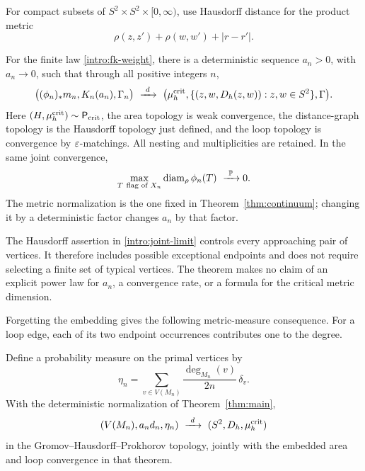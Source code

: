 For compact subsets of $S^2\times S^2\times[0,\infty)$, use Hausdorff distance for the product metric
\[
 \rho(z,z')+\rho(w,w')+|r-r'|.
\]

\begin{theorem}\label{thm:main}
For the finite law \eqref{intro:fk-weight}, there is a deterministic sequence $a_n>0$, with $a_n\to0$, such that through all positive integers $n$,
\begin{equation}\label{intro:joint-limit}
 \bigl((\phi_n)_*m_n,K_n(a_n),\Gamma_n\bigr)
 \ \xrightarrow{\ d\ }\
 \bigl(\mu_h^{\rm crit},
       \{(z,w,D_h(z,w)):z,w\in S^2\},\Gamma\bigr).
\end{equation}
Here $(H,\mu_h^{\rm crit})\sim\mathsf P_{\rm crit}$, the area topology is weak convergence, the distance-graph topology is the Hausdorff topology just defined, and the loop topology is convergence by $\varepsilon$-matchings. All nesting and multiplicities are retained. In the same joint convergence,
\begin{equation}\label{intro:flag-mesh}
 \max_{T\ \text{flag of }X_n}\operatorname{diam}_\rho\phi_n(T)
       \ \xrightarrow{\ \mathbb P\ }0.
\end{equation}
The metric normalization is the one fixed in Theorem~\ref{thm:continuum}; changing it by a deterministic factor changes $a_n$ by that factor.
\end{theorem}

The Hausdorff assertion in \eqref{intro:joint-limit} controls every approaching pair of vertices. It therefore includes possible exceptional endpoints and does not require selecting a finite set of typical vertices. The theorem makes no claim of an explicit power law for $a_n$, a convergence rate, or a formula for the critical metric dimension.

Forgetting the embedding gives the following metric-measure consequence.
For a loop edge, each of its two endpoint occurrences contributes one to
the degree.

\begin{corollary}\label{intro:ghp}
Define a probability measure on the primal vertices by
\[
 \eta_n=\sum_{v\in V(M_n)}\frac{\deg_{M_n}(v)}{2n}\,\delta_v.
\]
With the deterministic normalization of Theorem~\ref{thm:main},
\[
 (V(M_n),a_nd_n,\eta_n)
 \ \xrightarrow{\ d\ }\
 (S^2,D_h,\mu_h^{\rm crit})
\]
in the Gromov--Hausdorff--Prokhorov topology, jointly with the embedded
area and loop convergence in that theorem.
\end{corollary}

